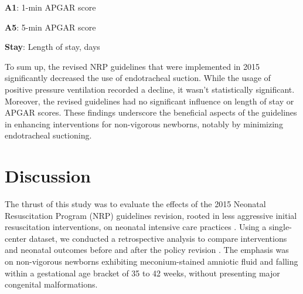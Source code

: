\documentclass[11pt]{article}
\begin{document}
\begin{table}[h]
\caption{Test of association between new policy and neonatal outcomes}
\label{table:association-outcomes}
\begin{threeparttable}
\renewcommand{\TPTminimum}{\linewidth}
\begin{tablenotes}
\footnotesize
\item \textbf{A1}: 1-min APGAR score
\item \textbf{A5}: 5-min APGAR score
\item \textbf{Stay}: Length of stay, days
\end{tablenotes}
\end{threeparttable}
\end{table}


To sum up, the revised NRP guidelines that were implemented in 2015 significantly decreased the use of endotracheal suction. While the usage of positive pressure ventilation recorded a decline, it wasn't statistically significant. Moreover, the revised guidelines had no significant influence on length of stay or APGAR scores. These findings underscore the beneficial aspects of the guidelines in enhancing interventions for non-vigorous newborns, notably by minimizing endotracheal suctioning.

\section*{Discussion}

The thrust of this study was to evaluate the effects of the 2015 Neonatal Resuscitation Program (NRP) guidelines revision, rooted in less aggressive initial resuscitation interventions, on neonatal intensive care practices \cite{Carbine2000VideoRA, Hutton2015OutcomesAW}. Using a single-center dataset, we conducted a retrospective analysis to compare interventions and neonatal outcomes before and after the policy revision \cite{Mileder2021TelesimulationAA, Lindhard2021SimulationBasedNR, Jacobs2004CardiacAA, Rubertsson2014MechanicalCC}. The emphasis was on non-vigorous newborns exhibiting meconium-stained amniotic fluid and falling within a gestational age bracket of 35 to 42 weeks, without presenting major congenital malformations.
\end{document}
